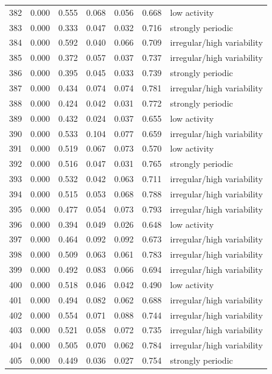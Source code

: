 \begin{longtable}{lrrrrrl}
382 & 0.000 & 0.555 & 0.068 & 0.056 & 0.668 & low activity \\
383 & 0.000 & 0.333 & 0.047 & 0.032 & 0.716 & strongly periodic \\
384 & 0.000 & 0.592 & 0.040 & 0.066 & 0.709 & irregular/high variability \\
385 & 0.000 & 0.372 & 0.057 & 0.037 & 0.737 & irregular/high variability \\
386 & 0.000 & 0.395 & 0.045 & 0.033 & 0.739 & strongly periodic \\
387 & 0.000 & 0.434 & 0.074 & 0.074 & 0.781 & irregular/high variability \\
388 & 0.000 & 0.424 & 0.042 & 0.031 & 0.772 & strongly periodic \\
389 & 0.000 & 0.432 & 0.024 & 0.037 & 0.655 & low activity \\
390 & 0.000 & 0.533 & 0.104 & 0.077 & 0.659 & irregular/high variability \\
391 & 0.000 & 0.519 & 0.067 & 0.073 & 0.570 & low activity \\
392 & 0.000 & 0.516 & 0.047 & 0.031 & 0.765 & strongly periodic \\
393 & 0.000 & 0.532 & 0.042 & 0.063 & 0.711 & irregular/high variability \\
394 & 0.000 & 0.515 & 0.053 & 0.068 & 0.788 & irregular/high variability \\
395 & 0.000 & 0.477 & 0.054 & 0.073 & 0.793 & irregular/high variability \\
396 & 0.000 & 0.394 & 0.049 & 0.026 & 0.648 & low activity \\
397 & 0.000 & 0.464 & 0.092 & 0.092 & 0.673 & irregular/high variability \\
398 & 0.000 & 0.509 & 0.063 & 0.061 & 0.783 & irregular/high variability \\
399 & 0.000 & 0.492 & 0.083 & 0.066 & 0.694 & irregular/high variability \\
400 & 0.000 & 0.518 & 0.046 & 0.042 & 0.490 & low activity \\
401 & 0.000 & 0.494 & 0.082 & 0.062 & 0.688 & irregular/high variability \\
402 & 0.000 & 0.554 & 0.071 & 0.088 & 0.744 & irregular/high variability \\
403 & 0.000 & 0.521 & 0.058 & 0.072 & 0.735 & irregular/high variability \\
404 & 0.000 & 0.505 & 0.070 & 0.062 & 0.784 & irregular/high variability \\
405 & 0.000 & 0.449 & 0.036 & 0.027 & 0.754 & strongly periodic \\

\end{longtable}
